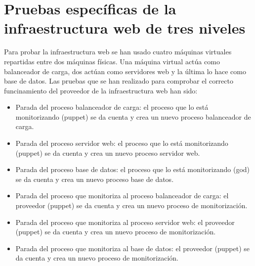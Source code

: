 \section{Pruebas específicas de la infraestructura web de tres niveles}

Para probar la infraestructura web se han usado cuatro máquinas virtuales repartidas entre dos máquinas físicas. Una máquina virtual actúa como balanceador de carga, dos actúan como servidores web y la última lo hace como base de datos. Las pruebas que se han realizado para comprobar el correcto funcinamiento del proveedor de la infraestructura web han sido:

\begin{itemize}
\item Parada del proceso balanceador de carga: el proceso que lo está monitorizando (puppet) se da cuenta y crea un nuevo proceso balanceador de carga.
\item Parada del proceso servidor web: el proceso que lo está monitorizando (puppet) se da cuenta y crea un nuevo proceso servidor web.
\item Parada del proceso base de datos: el proceso que lo está monitorizando (god) se da cuenta y crea un nuevo proceso base de datos.
\item Parada del proceso que monitoriza al proceso balanceador de carga: el proveedor (puppet) se da cuenta y crea un nuevo proceso de monitorización.
\item Parada del proceso que monitoriza al proceso servidor web: el proveedor (puppet) se da cuenta y crea un nuevo proceso de monitorización.
\item Parada del proceso que monitoriza al base de datos: el proveedor (puppet) se da cuenta y crea un nuevo proceso de monitorización.
\end{itemize}
